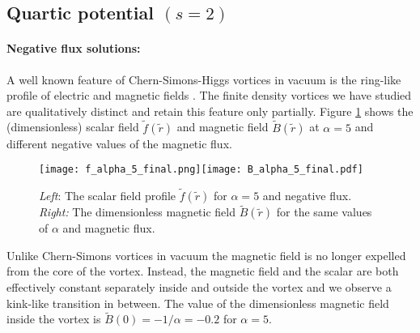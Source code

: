 \documentclass[12pt,a4paper]{article}
\begin{document}
\subsection{Quartic potential $(s=2)$}
\paragraph{Negative flux solutions:} A well known feature of Chern-Simons-Higgs vortices in vacuum is the ring-like profile of electric and magnetic fields \cite{Horvathy:2008hd}. The finite density vortices we have studied are qualitatively distinct and
retain this feature only partially. Figure  \ref{fig:scalarneg}  shows the (dimensionless) scalar field $\tilde f(\tilde r)$ and magnetic field $\tilde B(\tilde r )$  at $\alpha=5$ and different negative values of the magnetic flux.
\begin{figure}[h]
\begin{center}
    \texttt{[image: f\_alpha\_5\_final.png]}\texttt{[image: B\_alpha\_5\_final.pdf]}
   \caption{ {\small{\it Left}: The scalar field profile $\tilde f(\tilde r)$ for $\alpha=5$ and negative flux. {\it Right:} The dimensionless magnetic field $\tilde B(\tilde r)$ for the same values of $\alpha$ and magnetic flux.}} \label{fig:scalarneg}
   \end{center}
\end{figure}
Unlike Chern-Simons vortices in vacuum \cite{Horvathy:2008hd, Bolognesi:2007ez} the magnetic field is no longer expelled from the core of the vortex. Instead, the magnetic field and the scalar are both effectively constant separately inside and outside the vortex and we observe a kink-like transition in between.  The value of the dimensionless magnetic field inside the vortex is $\tilde B(0)= -1/\alpha=-0.2$ for $\alpha=5$. 
\end{document}
